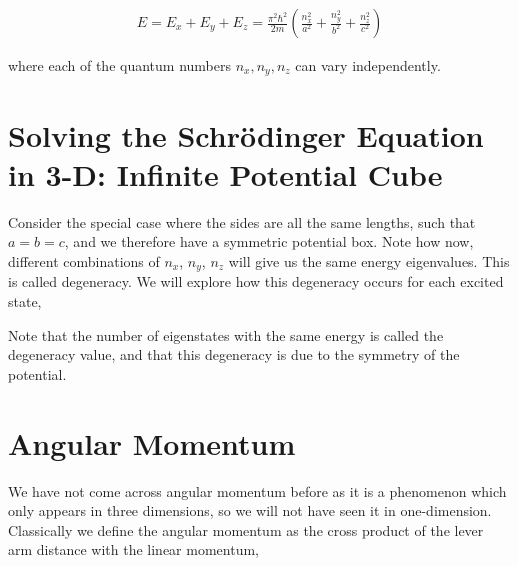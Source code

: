 \documentclass[11pt]{amsart}
\begin{document}
\begin{align*}
  E=E_x+E_y+E_z=\frac{\pi^2\hbar^2}{2m}\left(\frac{n_x^2}{a^2}+\frac{n_y^2}{b^2}+\frac{n_z^2}{c^2}\right)
\end{align*}

where each of the quantum numbers $n_x, n_y, n_z$ can vary independently.


\section{Solving the Schr\"{o}dinger Equation in 3-D: Infinite Potential Cube}

Consider the special case where the sides are all the same lengths, such that $a = b = c$, and we therefore have a symmetric potential box. Note how now, different combinations of $n_x$, $n_y$, $n_z$ will give us the same energy eigenvalues. This is called degeneracy. We will explore how this degeneracy occurs for each excited state,


Note that the number of eigenstates with the same energy is called the degeneracy value, and that this degeneracy is due to the symmetry of the potential.

\section{Angular Momentum}

We have not come across angular momentum before as it is a phenomenon which only appears in three dimensions, so we will not have seen it in one-dimension. Classically we define the angular momentum as the cross product of the lever arm distance with the linear momentum,
\end{document}
